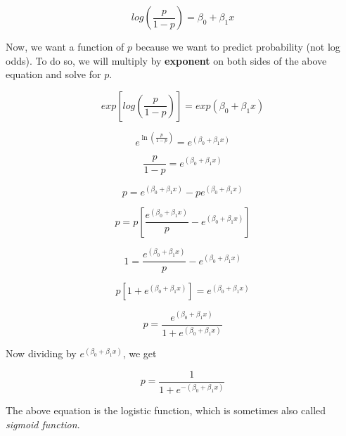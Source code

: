 \documentclass[
  letterpaper,
  DIV=11,
  numbers=noendperiod]{scrreprt}
\begin{document}
\begin{tcolorbox}
\[
log(\frac{p}{1-p}) = \beta_0 + \beta_1x
\]

Now, we want a function of \(p\) because we want to predict probability
(not log odds). To do so, we will multiply by \textbf{exponent} on both
sides of the above equation and solve for \(p\).

\[
exp[log(\frac{p}{1-p})] = exp(\beta_0 + \beta_1x)
\]

\[
e^{\ln\left(\frac{p}{1-p}\right)} = e^{(\beta_0 + \beta_1x)}
\]

\[
\frac{p}{1-p} = e^{(\beta_0 + \beta_1x)}
\]

\[
p = e^{(\beta_0 + \beta_1x)} - pe^{(\beta_0 + \beta_1x)}
\]

\[
p = p[\frac{e^{(\beta_0 + \beta_1x)}}{p} - e^{(\beta_0 + \beta_1x)}]
\]

\[
1 = \frac{e^{(\beta_0 + \beta_1x)}}{p} - e^{(\beta_0 + \beta_1x)}
\]

\[
p[1+e^{(\beta_0 + \beta_1x)}]=  e^{(\beta_0 + \beta_1x)}
\]

\[
p=  \frac{e^{(\beta_0 + \beta_1x)}}{1+e^{(\beta_0 + \beta_1x)}}
\]

Now dividing by \(e^{(\beta_0 + \beta_1x)}\), we get

\[
p = \frac{1}{1 + e^{-(\beta_0 + \beta_1x)}}
\]

The above equation is the logistic function, which is sometimes also
called \emph{sigmoid function}.

\end{tcolorbox}
\end{document}
